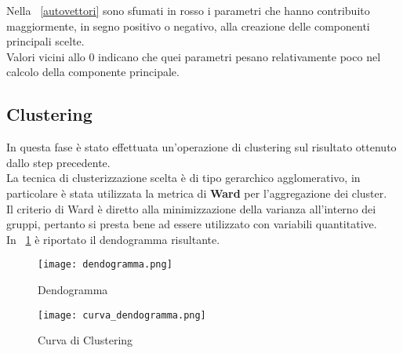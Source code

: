 Nella \figurename~\ref{autovettori} sono sfumati in rosso i parametri che
hanno contribuito maggiormente, in segno positivo o negativo, alla creazione
delle componenti principali scelte.\\
Valori vicini allo 0 indicano che quei parametri pesano relativamente poco nel
calcolo della componente principale.\\

\clearpage
\subsection{Clustering}
In questa fase è stato effettuata un'operazione di clustering sul risultato
ottenuto dallo step precedente.\\
La tecnica di clusterizzazione scelta è di tipo gerarchico agglomerativo,
in particolare è stata utilizzata la metrica di \textbf{Ward} per l'aggregazione
dei cluster.\\
Il criterio di Ward è diretto alla minimizzazione della varianza all’interno dei gruppi,
pertanto si presta bene ad essere utilizzato con variabili quantitative.\\
In \figurename~\ref{dendogramma} è riportato il dendogramma risultante.\\

\begin{figure}[!htbp]
	\texttt{[image: dendogramma.png]}
  \caption{Dendogramma}
  \label{dendogramma}
\end{figure}
\clearpage
\begin{figure}[!htbp]
	\texttt{[image: curva\_dendogramma.png]}
  \caption{Curva di Clustering}
  \label{curva_dendogramma}
\end{figure}

